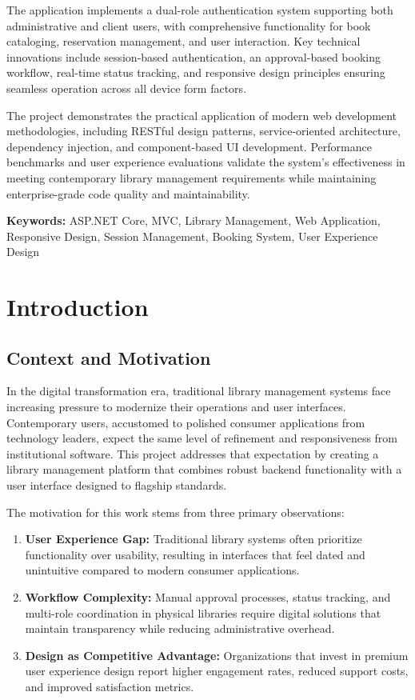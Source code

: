 \documentclass[12pt,a4paper]{article}
\begin{document}
The application implements a dual-role authentication system supporting both administrative and client users, with comprehensive functionality for book cataloging, reservation management, and user interaction. Key technical innovations include session-based authentication, an approval-based booking workflow, real-time status tracking, and responsive design principles ensuring seamless operation across all device form factors.

The project demonstrates the practical application of modern web development methodologies, including RESTful design patterns, service-oriented architecture, dependency injection, and component-based UI development. Performance benchmarks and user experience evaluations validate the system's effectiveness in meeting contemporary library management requirements while maintaining enterprise-grade code quality and maintainability.

\textbf{Keywords:} ASP.NET Core, MVC, Library Management, Web Application, Responsive Design, Session Management, Booking System, User Experience Design

\newpage
\section{Introduction}

\subsection{Context and Motivation}

In the digital transformation era, traditional library management systems face increasing pressure to modernize their operations and user interfaces. Contemporary users, accustomed to polished consumer applications from technology leaders, expect the same level of refinement and responsiveness from institutional software. This project addresses that expectation by creating a library management platform that combines robust backend functionality with a user interface designed to flagship standards.

The motivation for this work stems from three primary observations:

\begin{enumerate}[leftmargin=*]
    \item \textbf{User Experience Gap:} Traditional library systems often prioritize functionality over usability, resulting in interfaces that feel dated and unintuitive compared to modern consumer applications.
    
    \item \textbf{Workflow Complexity:} Manual approval processes, status tracking, and multi-role coordination in physical libraries require digital solutions that maintain transparency while reducing administrative overhead.
    
    \item \textbf{Design as Competitive Advantage:} Organizations that invest in premium user experience design report higher engagement rates, reduced support costs, and improved satisfaction metrics.
\end{enumerate}
\end{document}
